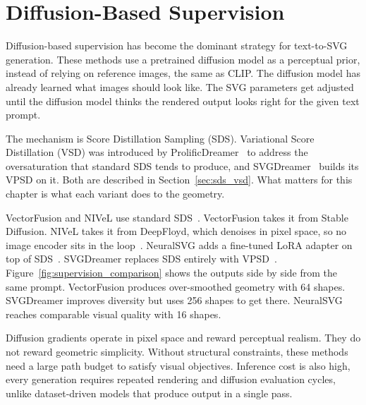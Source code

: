 \section{Diffusion-Based Supervision}
\label{sec:diffusion_supervision}

Diffusion-based supervision has become the dominant strategy for text-to-SVG generation. 
These methods use a pretrained diffusion model as a perceptual prior, instead of relying on reference images, the same as CLIP. 
The diffusion model has already learned what images should look like. 
The SVG parameters get adjusted until the diffusion model thinks the rendered output looks right for the given text prompt.

The mechanism is Score Distillation Sampling (SDS). Variational Score Distillation (VSD) 
was introduced by ProlificDreamer~\cite{wangProlificDreamerHighFidelityDiverse2023} to address the oversaturation 
that standard SDS tends to produce, and SVGDreamer~\cite{xingSVGDreamerTextGuided2024} builds its VPSD on it. 
Both are described in Section~\ref{sec:sds_vsd}. 
What matters for this chapter is what each variant does to the geometry.

VectorFusion and NIVeL use standard SDS~\cite{jainVectorFusionTexttoSVGAbstracting2022, thamizharasanNIVeLNeuralImplicit2024}. 
VectorFusion takes it from Stable Diffusion. NIVeL takes it from DeepFloyd, which denoises in pixel space, so no image encoder sits in the loop~\cite{thamizharasanNIVeLNeuralImplicit2024}. 
NeuralSVG adds a fine-tuned LoRA adapter on top of SDS~\cite{polaczekNeuralSVGImplicitRepresentation2025}. 
SVGDreamer replaces SDS entirely with VPSD~\cite{xingSVGDreamerTextGuided2024}. 
Figure~\ref{fig:supervision_comparison} shows the outputs side by side from the same prompt. 
VectorFusion produces over-smoothed geometry with 64 shapes. 
SVGDreamer improves diversity but uses 256 shapes to get there. 
NeuralSVG reaches comparable visual quality with 16 shapes. 

Diffusion gradients operate in pixel space and reward perceptual realism. 
They do not reward geometric simplicity. Without structural constraints, 
these methods need a large path budget to satisfy visual objectives.
Inference cost is also high, every generation requires repeated rendering and 
diffusion evaluation cycles, unlike dataset-driven models that produce output in a single pass.

